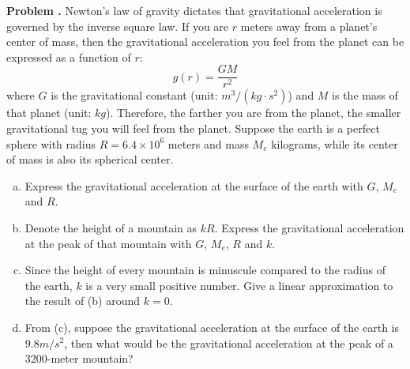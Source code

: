 \documentclass[11pt,letterpaper]{article}
\newcounter{problem}
\newcommand{\problem}{
	\stepcounter{problem}%
	\noindent \textbf{Problem \theproblem. }%
}
\begin{document}
\problem Newton's law of gravity dictates that gravitational acceleration is governed by the inverse square law.  If you are $r$ meters away from a planet's center of mass, then the gravitational acceleration you feel from the planet can be expressed as a function of $r$:
\[g(r) = \frac{GM}{r^2}\]
where $G$ is the gravitational constant (unit: $m^3/(kg \cdot s^2)$) and $M$ is the mass of that planet (unit: $kg$).  Therefore, the farther you are from the planet, the smaller gravitational tug you will feel from the planet.  Suppose the earth is a perfect sphere with radius $R = 6.4 \times 10^{6}$ meters and mass $M_e$ kilograms, while its center of mass is also its spherical center.
\begin{enumerate}[(a)]
    \item Express the gravitational acceleration at the surface of the earth with $G$, $M_e$ and $R$.
    \item Denote the height of a mountain as $kR$.  Express the gravitational acceleration at the peak of that mountain with $G$, $M_e$, $R$ and $k$.
    \item Since the height of every mountain is minuscule compared to the radius of the earth, $k$ is a very small positive number.  Give a linear approximation to the result of (b) around $k = 0$.
    \item From (c), suppose the gravitational acceleration at the surface of the earth is $9.8 m/s^2$, then what would be the gravitational acceleration at the peak of a $3200$-meter mountain?
\end{enumerate}
\vspace{6mm}

\end{document}
